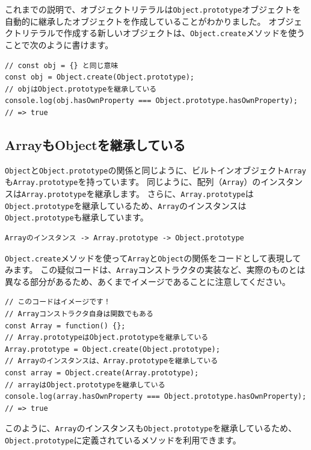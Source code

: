 これまでの説明で、オブジェクトリテラルは\texttt{Object.prototype}オブジェクトを自動的に継承したオブジェクトを作成していることがわかりました。
オブジェクトリテラルで作成する新しいオブジェクトは、\texttt{Object.create}メソッドを使うことで次のように書けます。

\begin{lstlisting}
// const obj = {} と同じ意味
const obj = Object.create(Object.prototype);
// objはObject.prototypeを継承している
console.log(obj.hasOwnProperty === Object.prototype.hasOwnProperty); // => true
\end{lstlisting}

\hypertarget{inherit-object}{%
\subsection{ArrayもObjectを継承している}\label{inherit-object}}

\texttt{Object}と\texttt{Object.prototype}の関係と同じように、ビルトインオブジェクト\texttt{Array}も\texttt{Array.prototype}を持っています。
同じように、配列（\texttt{Array}）のインスタンスは\texttt{Array.prototype}を継承します。
さらに、\texttt{Array.prototype}は\texttt{Object.prototype}を継承しているため、\texttt{Array}のインスタンスは\texttt{Object.prototype}も継承しています。

\begin{lstlisting}
Arrayのインスタンス -> Array.prototype -> Object.prototype
\end{lstlisting}

\texttt{Object.create}メソッドを使って\texttt{Array}と\texttt{Object}の関係をコードとして表現してみます。
この疑似コードは、\texttt{Array}コンストラクタの実装など、実際のものとは異なる部分があるため、あくまでイメージであることに注意してください。

\begin{lstlisting}
// このコードはイメージです！
// Arrayコンストラクタ自身は関数でもある
const Array = function() {};
// Array.prototypeはObject.prototypeを継承している
Array.prototype = Object.create(Object.prototype);
// Arrayのインスタンスは、Array.prototypeを継承している
const array = Object.create(Array.prototype);
// arrayはObject.prototypeを継承している
console.log(array.hasOwnProperty === Object.prototype.hasOwnProperty); 
// => true
\end{lstlisting}

このように、\texttt{Array}のインスタンスも\texttt{Object.prototype}を継承しているため、
\texttt{Object.prototype}に定義されているメソッドを利用できます。


